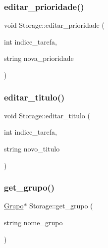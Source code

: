 \subsubsection{\texorpdfstring{editar\+\_\+prioridade()}{editar\_prioridade()}}
{\footnotesize\ttfamily void Storage\+::editar\+\_\+prioridade (\begin{DoxyParamCaption}\item[{int}]{indice\+\_\+tarefa,  }\item[{string}]{nova\+\_\+prioridade }\end{DoxyParamCaption})}

\mbox{\label{classStorage_a6164e94fc3a86249dcce0aa66320ad2b}} 
\subsubsection{\texorpdfstring{editar\+\_\+titulo()}{editar\_titulo()}}
{\footnotesize\ttfamily void Storage\+::editar\+\_\+titulo (\begin{DoxyParamCaption}\item[{int}]{indice\+\_\+tarefa,  }\item[{string}]{novo\+\_\+titulo }\end{DoxyParamCaption})}

\mbox{\label{classStorage_a1b478e593dd0b18eeb7fc0490b87b362}} 
\subsubsection{\texorpdfstring{get\+\_\+grupo()}{get\_grupo()}\hspace{0.1cm}{\footnotesize\ttfamily [1/2]}}
{\footnotesize\ttfamily \hyperlink{classGrupo}{Grupo}$\ast$ Storage\+::get\+\_\+grupo (\begin{DoxyParamCaption}\item[{string}]{nome\+\_\+grupo }\end{DoxyParamCaption})}

\mbox{\label{classStorage_af340fa785af6416b6d7ca0eb38ea4be7}} 
